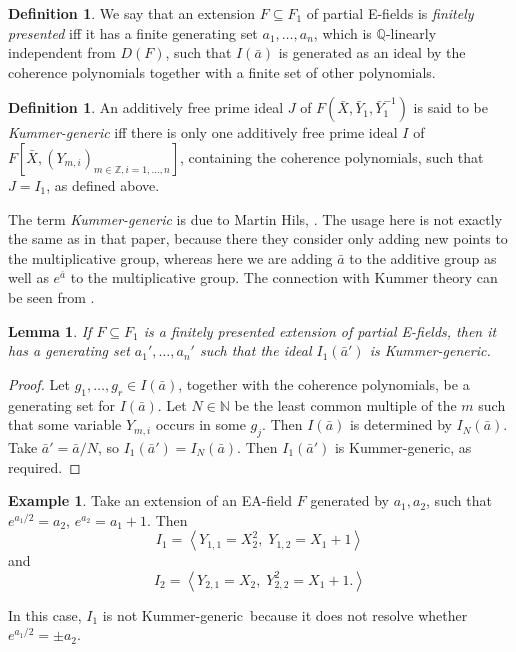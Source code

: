 \documentclass[12pt]{amsart}
\newtheorem{lemma}[prop]{Lemma}
\theoremstyle{definition}
\newtheorem{defn}[prop]{Definition}
\newtheorem{example}[prop]{Example}
\begin{document}
\begin{defn}
  We say that an extension $F {\subseteq} F_1$ of partial E-fields is \emph{finitely presented} iff it has a finite generating set $a_1,\ldots,a_n$, which is {\ensuremath{\mathbb{Q}}}-linearly independent from $D(F)$, such that $I({{\ensuremath{\bar{a}}}})$ is generated as an ideal by the coherence polynomials together with a finite set of other polynomials.
\end{defn}
\begin{defn}
  An additively free prime ideal $J$ of $F({{\ensuremath{\bar{X}}}},{{\ensuremath{\bar{Y}}}}_1,{{\ensuremath{\bar{Y}}}}_1^{-1})$ is said to be \emph{Kummer-generic} iff there is only one additively free prime ideal $I$ of $F[\bar{X},(Y_{m,i})_{m \in {\ensuremath{\mathbb{Z}}}, i=1,\ldots,n}]$, containing the coherence polynomials, such that $J = I_1$, as defined above.
\end{defn}
The term \emph{Kummer-generic} is due to Martin Hils, \cite[p10]{Hils10}. The usage here is not exactly the same as in that paper, because there they consider only adding new points to the multiplicative group, whereas here we are adding ${{\ensuremath{\bar{a}}}}$ to the additive group as well as $e^{{\ensuremath{\bar{a}}}}$ to the multiplicative group. The connection with Kummer theory can be seen from \cite[Lemma~5.1]{BZ11}.

\begin{lemma}\label{rootdet lemma}
  If $F {\subseteq} F_1$ is a finitely presented extension of partial E-fields, then it has a generating set $a_1',\ldots,a_n'$ such that the ideal $I_1({{\ensuremath{\bar{a}}}}')$ is {Kummer-generic}.
\end{lemma}
\begin{proof}
 Let $g_1,\ldots,g_r \in I({{\ensuremath{\bar{a}}}})$, together with the coherence polynomials, be a generating set for $I({{\ensuremath{\bar{a}}}})$. Let $N \in {\ensuremath{\mathbb{N}}}$ be the least common multiple of the $m$ such that some variable $Y_{m,i}$ occurs in some $g_j$. Then $I({{\ensuremath{\bar{a}}}})$ is determined by $I_N({{\ensuremath{\bar{a}}}})$. Take ${{\ensuremath{\bar{a}}}}' = {{\ensuremath{\bar{a}}}}/N$, so $I_1({{\ensuremath{\bar{a}}}}') = I_N({{\ensuremath{\bar{a}}}})$. Then $I_1({{\ensuremath{\bar{a}}}}')$ is {Kummer-generic}, as required.
\end{proof}

\begin{example}
Take an extension of an EA-field $F$ generated by $a_1,a_2$, such
  that $e^{a_1/2} = a_2$, $e^{a_2} = a_1+1$. Then 
  \[I_1 = {\ensuremath{\left\langle {Y_{1,1} = X_2^2,\; Y_{1,2} = X_1 + 1} \right\rangle}}\]
  and 
  \[I_2 = {\ensuremath{\left\langle {Y_{2,1} = X_2,\; Y_{2,2}^2 = X_1 + 1.} \right\rangle}}\]

 In this case, $I_1$ is not {Kummer-generic}\ because it does not resolve
  whether $e^{a_1/2} = \pm a_2$.
\end{example}
\end{document}
